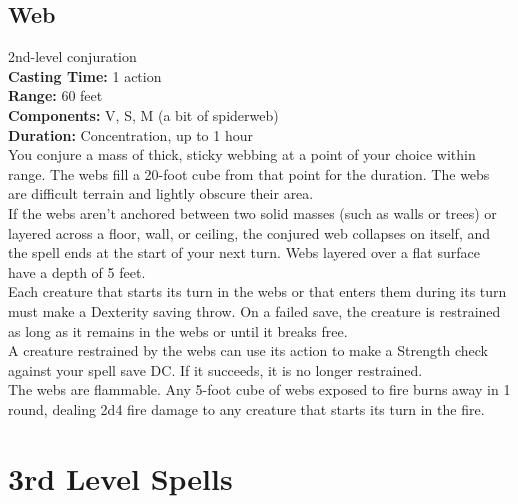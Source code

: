 \documentclass[11pt, A4paper, english]{article}
\begin{document}
		\subsection{Web}
2nd-level conjuration \\
\textbf{Casting Time:} 1 action \\
\textbf{Range:} 60 feet \\
\textbf{Components:} V, S, M (a bit of spiderweb) \\
\textbf{Duration:} Concentration, up to 1 hour \\
You conjure a mass of thick, sticky webbing at a point of your choice within range. The webs fill a 20-foot cube from that point for the duration. The webs are difficult terrain and lightly obscure their area. \\
If the webs aren’t anchored between two solid masses (such as walls or trees) or layered across a floor, wall, or ceiling, the conjured web collapses on itself, and the spell ends at the start of your next turn. Webs layered over a flat surface have a depth of 5 feet. \\
Each creature that starts its turn in the webs or that enters them during its turn must make a Dexterity saving throw. On a failed save, the creature is restrained as long as it remains in the webs or until it breaks free. \\
A creature restrained by the webs can use its action to make a Strength check against your spell save DC. If it succeeds, it is no longer restrained. \\
The webs are flammable. Any 5-foot cube of webs exposed to fire burns away in 1 round, dealing 2d4 fire damage to any creature that starts its turn in the fire.



	\section{3rd Level Spells}
\end{document}
